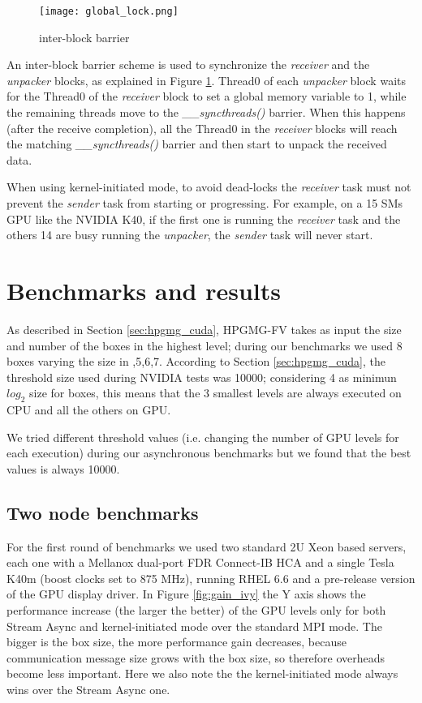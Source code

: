 \documentclass[conference]{IEEEtran}
\begin{document}
\begin{figure}[h]
\texttt{[image: global\_lock.png]}
\caption{inter-block barrier}
\label{fig:global_lock}
\end{figure}

An inter-block barrier scheme is used to synchronize the \textit{receiver}
and the \textit{unpacker} blocks, as explained in Figure
\ref{fig:global_lock}.
% 
Thread0 of each \textit{unpacker} block waits for the Thread0 of the
\textit{receiver} block to set a global memory variable to 1, while the
remaining threads move to the \textit{\_\_syncthreads()} barrier.
%
When this happens (after the receive completion), all the Thread0 in the
\textit{receiver} blocks will reach the matching \textit{\_\_syncthreads()}
barrier and then start to unpack the received data.

When using kernel-initiated mode, to avoid dead-locks the \textit{receiver}
task must not prevent the \textit{sender} task from starting or
progressing.
% 
For example, on a 15 SMs GPU like the NVIDIA K40, if the first one is running the
\textit{receiver} task and the others 14 are busy running the
\textit{unpacker}, the \textit{sender} task will never start.

\section{Benchmarks and results}

As described in Section \ref{sec:hpgmg_cuda}, HPGMG-FV takes as input the size and number of the boxes in the highest level; during our benchmarks we used 8 boxes varying the size in ,5,6,7\rbrack.
According to Section \ref{sec:hpgmg_cuda}, the threshold size used during NVIDIA tests was 10000; considering 4 as minimun $log_2$ size for boxes, this means that the 3 smallest levels are always executed on CPU and all the others on GPU.

We tried different threshold values (i.e. changing the number of GPU levels for each execution) during our asynchronous benchmarks but we found that the best values is always 10000.

\subsection{Two node benchmarks}
\label{sec:two-nodes}

For the first round of benchmarks we used two standard 2U Xeon based
servers, each one with a Mellanox dual-port FDR Connect-IB HCA and a single
Tesla K40m (boost clocks set to 875 MHz), running RHEL 6.6 and a
pre-release version of the GPU display driver.
% 
In Figure \ref{fig:gain_ivy} the Y axis shows the performance increase (the
larger the better) of the GPU levels only for both Stream Async and
kernel-initiated mode over the standard MPI mode. 
%
The bigger is the box size, the more performance gain decreases, because
communication message size grows with the box size, so therefore
overheads become less important.
% 
Here we also note the the kernel-initiated mode always wins over the
Stream Async one.
\end{document}
